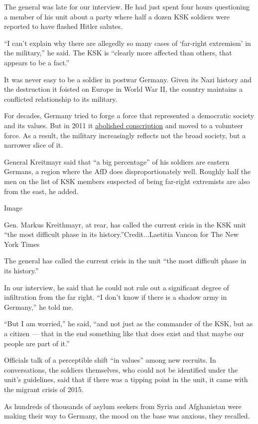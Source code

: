 The general was late for our interview. He had just spent four hours
questioning a member of his unit about a party where half a dozen KSK
soldiers were reported to have flashed Hitler salutes.

``I can't explain why there are allegedly so many cases of `far-right
extremism' in the military,'' he said. The KSK is ``clearly more
affected than others, that appears to be a fact.''

It was never easy to be a soldier in postwar Germany. Given its Nazi
history and the destruction it foisted on Europe in World War II, the
country maintains a conflicted relationship to its military.

For decades, Germany tried to forge a force that represented a
democratic society and its values. But in 2011 it
\href{https://www.nytimes.com/2011/07/01/world/europe/01germany.html}{abolished
conscription} and moved to a volunteer force. As a result, the military
increasingly reflects not the broad society, but a narrower slice of it.

General Kreitmayr said that ``a big percentage'' of his soldiers are
eastern Germans, a region where the AfD does disproportionately well.
Roughly half the men on the list of KSK members suspected of being
far-right extremists are also from the east, he added.

Image

Gen. Markus Kreithmayr, at rear, has called the current crisis in the
KSK unit ``the most difficult phase in its history.''Credit...Laetitia
Vancon for The New York Times

The general has called the current crisis in the unit ``the most
difficult phase in its history.''

In our interview, he said that he could not rule out a significant
degree of infiltration from the far right. ``I don't know if there is a
shadow army in Germany,'' he told me.

``But I am worried,'' he said, ``and not just as the commander of the
KSK, but as a citizen --- that in the end something like that does exist
and that maybe our people are part of it.''

Officials talk of a perceptible shift ``in values'' among new recruits.
In conversations, the soldiers themselves, who could not be identified
under the unit's guidelines, said that if there was a tipping point in
the unit, it came with the migrant crisis of 2015.

As hundreds of thousands of asylum seekers from Syria and Afghanistan
were making their way to Germany, the mood on the base was anxious, they
recalled.

